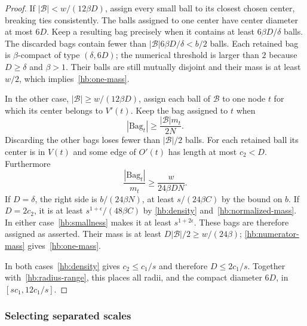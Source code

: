 \documentclass[11pt]{amsart}
\theoremstyle{definition}
\theoremstyle{remark}
\numberwithin{equation}{section}
\begin{document}
\begin{proof}
If $|\mathcal B|<w/(12\beta D)$, assign every small ball to its closest
chosen center, breaking ties consistently.  The balls assigned to one
center have center diameter at most $6D$.  Keep a resulting bag
precisely when it contains at least $6\beta D/\delta$ balls.
The discarded bags contain fewer than
$|\mathcal B|6\beta D/\delta<b/2$ balls.  Each retained bag is
$\beta$-compact of type $(\delta,6D)$; the numerical threshold is
larger than $2$ because $D\ge\delta$ and $\beta>1$.
Their balls are still mutually disjoint and their mass is at least
$w/2$, which implies~\eqref{hb:one-mass}.

In the other case, $|\mathcal B|\ge w/(12\beta D)$, assign each ball
of $\mathcal B$ to one node $t$ for which its center belongs to $V'(t)$.
Keep the bag assigned to $t$ when
\[
 |\mathrm{Bag}_t|\ge\frac{|\mathcal B|m_t}{2N}.
\]
Discarding the other bags loses fewer than $|\mathcal B|/2$ balls.
For each retained ball its center is in $V(t)$ and some edge of
$O'(t)$ has length at most $c_2<D$.  Furthermore
\begin{equation}\label{hb:assignment-size}
 \frac{|\mathrm{Bag}_t|}{m_t}
 \ge\frac{w}{24\beta DN}.
\end{equation}
If $D=\delta$, the right side is $b/(24\beta N)$, at least
$s/(24\beta C)$ by the bound on $b$.  If $D=2c_2$, it is at least
$s^{1+\epsilon}/(48\beta C)$ by
\eqref{hb:density} and~\eqref{hb:normalized-mass}.
In either case~\eqref{hb:smallness} makes it at least
$s^{1+2\epsilon}$.  These bags are therefore assigned as asserted.
Their mass is at least $D|\mathcal B|/2\ge w/(24\beta)$;
\eqref{hb:numerator-mass} gives~\eqref{hb:one-mass}.

In both cases~\eqref{hb:density} gives $c_2\le c_1/s$ and therefore
$D\le2c_1/s$.  Together with~\eqref{hb:radius-range}, this places all
radii, and the compact diameter $6D$, in $[sc_1,12c_1/s]$.
\end{proof}

\subsubsection{Selecting separated scales}
\end{document}
